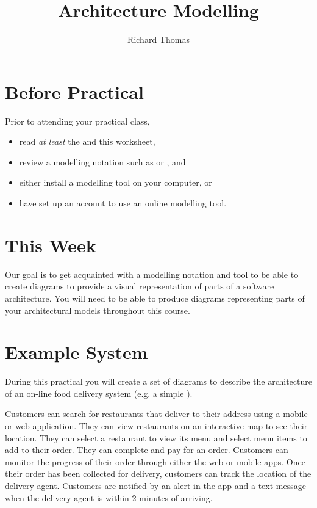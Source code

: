 \documentclass{csse4400}
\title{Architecture Modelling}
\author{Richard Thomas}
\date{\week{2}}
\begin{document}
\maketitle

\section{Before Practical}
Prior to attending your practical class,
\begin{itemize}
    \item read \emph{at least} the  and this worksheet,
    \item review a modelling notation such as  or , and
    \item either install a modelling tool on your computer, or
    \item have set up an account to use an online modelling tool.
\end{itemize}


\section{This Week}
Our goal is to get acquainted with a modelling notation and tool to be able to create diagrams to provide a visual representation of parts of a software architecture.
You will need to be able to produce diagrams representing parts of your architectural models throughout this course.


\section{Example System}
During this practical you will create a set of diagrams to describe the architecture of an on-line food delivery system (e.g. a simple ).

Customers can search for restaurants that deliver to their address using a mobile or web application.
They can view restaurants on an interactive map to see their location.
They can select a restaurant to view its menu and select menu items to add to their order.
They can complete and pay for an order.
Customers can monitor the progress of their order through either the web or mobile apps.
Once their order has been collected for delivery, customers can track the location of the delivery agent.
Customers are notified by an alert in the app and a text message when the delivery agent is within 2 minutes of arriving.
\end{document}
